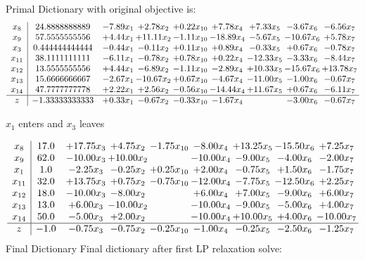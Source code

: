 \documentclass[8pt]{article}
\begin{document}
Primal Dictionary with original objective is:
\[\begin{array}{c| c c@{\hskip 2pt} c@{\hskip 2pt} c@{\hskip 2pt} c@{\hskip 2pt} c@{\hskip 2pt} c@{\hskip 2pt} c@{\hskip 2pt} }
 x_{8}   &  24.8888888889 & -7.89 x_{1} & +  2.78 x_{2} & +  0.22 x_{10} & +  7.78 x_{4} & +  7.33 x_{5} & -3.67 x_{6} & -6.56 x_{7}\\
 x_{9}   &  57.5555555556 & +  4.44 x_{1} & + 11.11 x_{2} & -1.11 x_{10} & -18.89 x_{4} & -5.67 x_{5} & -10.67 x_{6} & +  5.78 x_{7}\\
 x_{3}   &  0.444444444444 & -0.44 x_{1} & -0.11 x_{2} & +  0.11 x_{10} & +  0.89 x_{4} & -0.33 x_{5} & +  0.67 x_{6} & -0.78 x_{7}\\
 x_{11}   &  38.1111111111 & -6.11 x_{1} & -0.78 x_{2} & +  0.78 x_{10} & +  0.22 x_{4} & -12.33 x_{5} & -3.33 x_{6} & -8.44 x_{7}\\
 x_{12}   &  13.5555555556 & +  4.44 x_{1} & -6.89 x_{2} & -1.11 x_{10} & -2.89 x_{4} & + 10.33 x_{5} & -15.67 x_{6} & + 13.78 x_{7}\\
 x_{13}   &  15.6666666667 & -2.67 x_{1} & -10.67 x_{2} & +  0.67 x_{10} & -4.67 x_{4} & -11.00 x_{5} & -1.00 x_{6} & -0.67 x_{7}\\
 x_{14}   &  47.7777777778 & +  2.22 x_{1} & +  2.56 x_{2} & -0.56 x_{10} & -14.44 x_{4} & + 11.67 x_{5} & +  0.67 x_{6} & -6.11 x_{7}\\
\hline
z    &  -1.33333333333 & +  0.33 x_{1} & -0.67 x_{2} & -0.33 x_{10} & -1.67 x_{4} &   & -3.00 x_{6} & -0.67 x_{7}\\
\end{array}\]


 $ x_{1} $ enters and $ x_{3} $ leaves 

 \[\begin{array}{c| c c@{\hskip 2pt} c@{\hskip 2pt} c@{\hskip 2pt} c@{\hskip 2pt} c@{\hskip 2pt} c@{\hskip 2pt} c@{\hskip 2pt} }
 x_{8}   &  17.0 & + 17.75 x_{3} & +  4.75 x_{2} & -1.75 x_{10} & -8.00 x_{4} & + 13.25 x_{5} & -15.50 x_{6} & +  7.25 x_{7}\\
 x_{9}   &  62.0 & -10.00 x_{3} & + 10.00 x_{2} &   & -10.00 x_{4} & -9.00 x_{5} & -4.00 x_{6} & -2.00 x_{7}\\
 x_{1}   &  1.0 & -2.25 x_{3} & -0.25 x_{2} & +  0.25 x_{10} & +  2.00 x_{4} & -0.75 x_{5} & +  1.50 x_{6} & -1.75 x_{7}\\
 x_{11}   &  32.0 & + 13.75 x_{3} & +  0.75 x_{2} & -0.75 x_{10} & -12.00 x_{4} & -7.75 x_{5} & -12.50 x_{6} & +  2.25 x_{7}\\
 x_{12}   &  18.0 & -10.00 x_{3} & -8.00 x_{2} &   & +  6.00 x_{4} & +  7.00 x_{5} & -9.00 x_{6} & +  6.00 x_{7}\\
 x_{13}   &  13.0 & +  6.00 x_{3} & -10.00 x_{2} &   & -10.00 x_{4} & -9.00 x_{5} & -5.00 x_{6} & +  4.00 x_{7}\\
 x_{14}   &  50.0 & -5.00 x_{3} & +  2.00 x_{2} &   & -10.00 x_{4} & + 10.00 x_{5} & +  4.00 x_{6} & -10.00 x_{7}\\
\hline
z    &  -1.0 & -0.75 x_{3} & -0.75 x_{2} & -0.25 x_{10} & -1.00 x_{4} & -0.25 x_{5} & -2.50 x_{6} & -1.25 x_{7}\\
\end{array}\]
Final Dictionary
Final dictionary after first LP relaxation solve: 
\end{document}
